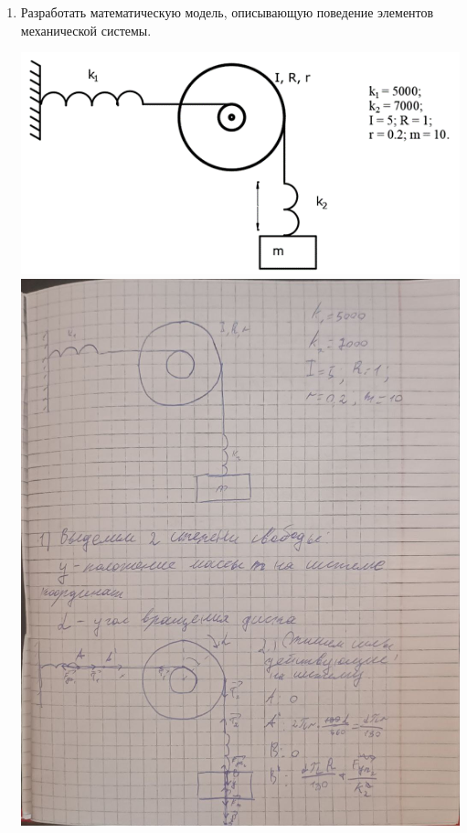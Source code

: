 \documentclass[a4paper,14pt]{extarticle}
\begin{document}
\begin{enumerate}[1. ]
    \item Разработать математическую модель, описывающую поведение элементов механической системы.\\
          \begin{center}
              \includegraphics[width=140mm]{variant.png}
              \bigbreak
              \includegraphics[width=140mm]{mod1.jpg}

\end{center}
\end{enumerate}
\end{document}
